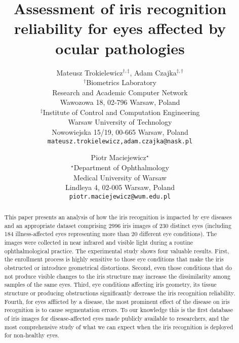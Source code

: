 \documentclass[10pt,twocolumn,letterpaper]{article}
\begin{document}
\title{Assessment of iris recognition reliability for eyes affected by ocular pathologies}

\author{Mateusz Trokielewicz$^{\dag,\ddag}$, Adam Czajka$^{\ddag,\dag}$\\
$^{\dag}$Biometrics Laboratory\\
Research and Academic Computer Network\\
Wawozowa 18, 02-796 Warsaw, Poland\\
$^{\ddag}$Institute of Control and Computation Engineering\\
Warsaw University of Technology\\
Nowowiejska 15/19, 00-665 Warsaw, Poland\\
{\tt\small {mateusz.trokielewicz,adam.czajka}@nask.pl}
\and
Piotr Maciejewicz$^{\star}$\\
$^{\star}$Department of Ophthalmology\\
Medical University of Warsaw\\
Lindleya 4, 02-005 Warsaw, Poland\\
{\tt\small piotr.maciejewicz@wum.edu.pl}
}

\maketitle
\thispagestyle{empty}

\begin{abstract}

This paper presents an analysis of how the iris recognition is impacted by eye diseases and an appropriate dataset comprising 2996 iris images of 230 distinct eyes (including 184 illness-affected eyes representing more than 20 different eye conditions). The images were collected in near infrared and visible light during a routine ophthalmological practice. The experimental study shows four valuable results. First, the enrollment process is highly sensitive to those eye conditions that make the iris obstructed or introduce geometrical distortions. Second, even those conditions that do not produce visible changes to the iris structure may increase the dissimilarity among samples of the same eyes. Third, eye conditions affecting iris geometry, its tissue structure or producing obstructions significantly decrease the iris recognition reliability. Fourth, for eyes afflicted by a disease, the most prominent effect of the disease on iris recognition is to cause segmentation errors. To our knowledge this is the first database of iris images for disease-affected eyes made publicly available to researchers, and the most comprehensive study of what we can expect when the iris recognition is deployed for non-healthy eyes.

\end{abstract}
\end{document}
